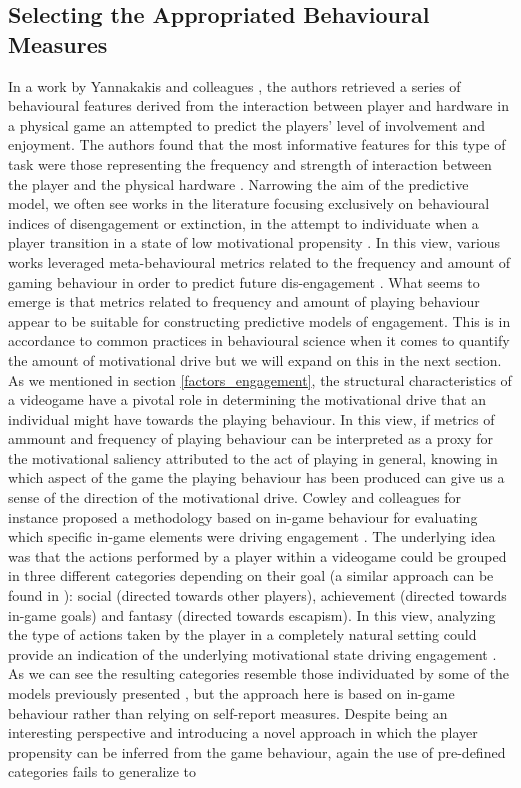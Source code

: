 \subsection{Selecting the Appropriated Behavioural Measures} In a work by Yannakakis and colleagues \cite{yannakakis2007game}, the authors retrieved a series of behavioural features derived from the interaction between player and hardware in a physical game an attempted to predict the players' level of involvement and enjoyment. The authors found that the most informative features for this type of task were those representing the frequency and strength of interaction between the player and the physical hardware \cite{yannakakis2007game}. Narrowing the aim of the predictive model, we often see works in the literature focusing exclusively on behavioural indices of disengagement or extinction, in the attempt to individuate when a player transition in a state of low motivational propensity \cite{el2021game}. In this view, various works leveraged meta-behavioural metrics related to the frequency and amount of gaming behaviour in order to predict future dis-engagement \cite{runge2014churn, kim2017churn, hadiji2014predicting}. What seems to emerge is that metrics related to frequency and amount of playing behaviour appear to be suitable for constructing predictive models of engagement. This is in accordance to common practices in behavioural science when it comes to quantify the amount of motivational drive \cite{cacioppo2007handbook} but we will expand on this in the next section. As we mentioned in section \ref{factors_engagement}, the structural characteristics of a videogame have a pivotal role in determining the motivational drive that an individual might have towards the playing behaviour. In this view, if metrics of ammount and frequency of playing behaviour can be interpreted as a proxy for the motivational saliency attributed to the act of playing in general, knowing in which aspect of the game the playing behaviour has been produced can give us a sense of the direction of the motivational drive. Cowley and colleagues for instance proposed a methodology based on in-game behaviour for evaluating which specific in-game elements were driving engagement \cite{cowley2016behavlets}. The underlying idea was that the actions performed by a player within a videogame could be grouped in three different categories depending on their goal (a similar approach can be found in \cite{bartle1996hearts}): social (directed towards other players), achievement (directed towards in-game goals) and fantasy (directed towards escapism). In this view, analyzing the type of actions taken by the player in a completely natural setting could provide an indication of the underlying motivational state driving engagement \cite{cowley2016behavlets}. As we can see the resulting categories resemble those individuated by some of the models previously presented \cite{yee2006motivations, bartle1996hearts}, but the approach here is based on in-game behaviour rather than relying on self-report measures. Despite being an interesting perspective and introducing a novel approach in which the player propensity can be inferred from the game behaviour, again the use of pre-defined categories fails to generalize to 